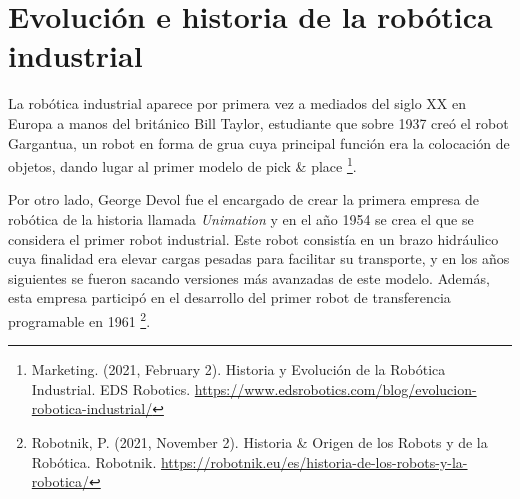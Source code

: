 \section{Evolución e historia de la robótica industrial}
\label{sec:segundaseccion}

La robótica industrial aparece por primera vez a mediados del siglo XX en Europa a manos del británico Bill Taylor, estudiante que sobre 1937 creó el robot Gargantua, un robot en forma de grua cuya principal función era la colocación de objetos, dando lugar al primer modelo de pick \& place \footnote{Marketing. (2021, February 2). Historia y Evolución de la Robótica Industrial. EDS Robotics. \url{https://www.edsrobotics.com/blog/evolucion-robotica-industrial/}}. 

Por otro lado, George Devol fue el encargado de crear la primera empresa de robótica de la historia llamada \textit{Unimation} y en el año 1954 se crea el que se considera el primer robot industrial. Este robot consistía en un brazo hidráulico cuya finalidad era elevar cargas pesadas para facilitar su transporte, y en los años siguientes se fueron sacando versiones más avanzadas de este modelo. Además, esta empresa participó en el desarrollo del primer robot de transferencia programable en 1961 \footnote{Robotnik, P. (2021, November 2). Historia \& Origen de los Robots y de la Robótica. Robotnik. \url{https://robotnik.eu/es/historia-de-los-robots-y-la-robotica/}}. \\



